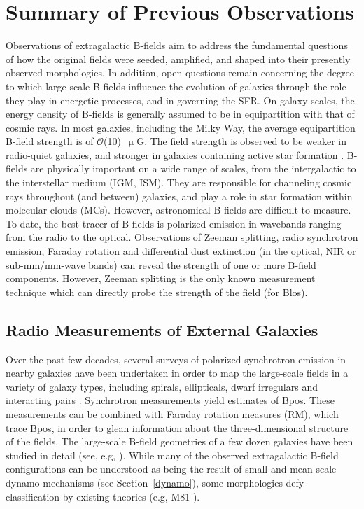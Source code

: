\section{Summary of Previous Observations}\label{previous obs}

Observations of extragalactic B-fields aim to address the fundamental questions of how the original fields were seeded, amplified, and shaped into their presently observed morphologies. In addition, open questions remain concerning the degree to which large-scale B-fields influence the evolution of galaxies through the role they play in energetic processes, and in governing the SFR. On galaxy scales, the energy density of B-fields is generally assumed to be in equipartition with that of cosmic rays. In most galaxies, including the Milky Way, the average equipartition B-field strength is of $\mathcal{O}$(10)~$\upmu$G. The field strength is observed to be weaker in radio-quiet galaxies, and stronger in galaxies containing active star formation \citep{beck2016magnetic}. B-fields are physically important on a wide range of scales, from the intergalactic to the interstellar medium (IGM, ISM). They are responsible for channeling cosmic rays throughout (and between) galaxies, and play a role in star formation within molecular clouds (MCs). However, astronomical B-fields are difficult to measure. To date, the best tracer of B-fields is polarized emission in wavebands ranging from the radio to the optical. Observations of Zeeman splitting, radio synchrotron emission, Faraday rotation and differential dust extinction (in the optical, NIR or sub-mm/mm-wave bands) can reveal the strength of one or more B-field components. However, Zeeman splitting is the only known measurement technique which can directly probe the strength of the field (for \gls{Blos}).

\subsection{Radio Measurements of External Galaxies}
Over the past few decades, several surveys of polarized synchrotron emission in nearby galaxies have been undertaken in order to map the large-scale fields in a variety of galaxy types, including spirals, ellipticals, dwarf irregulars and interacting pairs \citep{van2015magnetic}. Synchrotron measurements yield estimates of \gls{Bpos}. These measurements can be combined with Faraday rotation measures (RM), which trace \gls{Bpos}, in order to glean information about the three-dimensional structure of the fields. The large-scale B-field geometries of a few dozen galaxies have been studied in detail (see, e.g, \citet{sofue1985large,beck2005magnetic,beck2016magnetic}). While many of the observed extragalactic B-field configurations can be understood as being the result of small and mean-scale dynamo mechanisms (see Section~\ref{dynamo}), some morphologies defy classification by existing theories (e.g, M81 \citet{beck2006origin}).

